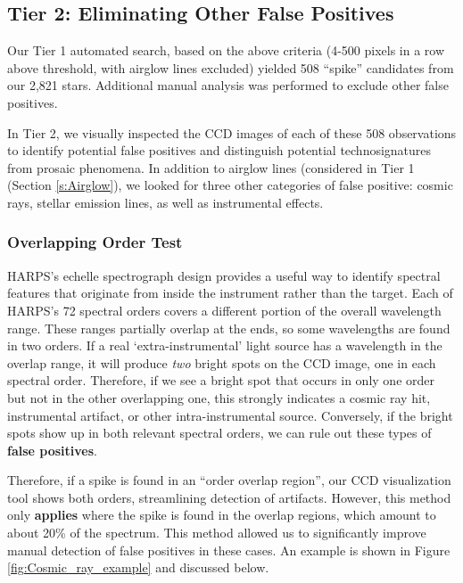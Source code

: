 \documentclass[linenumbers]{aastex701}
\providecommand{\DIFadd}[1]{{\bf #1}} %
\providecommand{\DIFaddbegin}{} %
\providecommand{\DIFaddend}{} %
\begin{document}
\subsection{Tier 2: Eliminating Other False Positives}
\label{s:falsepositive}
Our Tier 1 automated search, based on the above criteria (4-500 pixels in a row above threshold, with airglow lines excluded) yielded 508  \DIFaddbegin \enquote{spike} \DIFaddend candidates from our 2,821 stars. Additional manual analysis was performed to exclude other false positives.

In Tier 2, we visually inspected the CCD images of each of these 508 observations to identify potential false positives and distinguish potential technosignatures from prosaic phenomena.  In addition to airglow lines (considered in Tier 1 (Section \ref{s:Airglow}), we looked for three other categories of false positive: cosmic rays, stellar emission lines, as well as instrumental effects.

\subsubsection{Overlapping Order Test}
\label{s:overlapping_orders}
HARPS's echelle spectrograph design provides a useful way to identify spectral features that originate from inside the instrument rather than the target.  Each of HARPS's 72 spectral orders covers a different portion of the overall wavelength range. These ranges partially overlap at the ends, so some wavelengths are found in two orders.  If a real `extra-instrumental' light source has a wavelength in the overlap range, it will produce \emph{two} bright spots on the CCD image, one in each spectral order. Therefore, if we see a bright spot that occurs in only one order but not in the other overlapping one, this strongly indicates a cosmic ray hit, instrumental artifact, or other intra-instrumental source.  Conversely, if the bright spots show up in both relevant spectral orders, we can rule out these types of  \DIFaddbegin \DIFadd{false positives}\DIFaddend .

Therefore, if a spike is found in an  \DIFaddbegin \enquote{order overlap region}\DIFaddend , our CCD visualization tool shows both orders, streamlining detection of artifacts.  However, this method only  \DIFaddbegin \DIFadd{applies  }\DIFaddend where the spike is found in the overlap regions, which amount to about 20\% of the spectrum.  This method allowed us to significantly improve manual detection of false positives in these cases.  An example is shown in Figure \ref{fig:Cosmic_ray_example} and discussed below.
\end{document}
